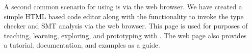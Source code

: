 A second common scenario for using \Klang{} is via the web browser. We
have created a simple HTML based \Klang{} code editor along with the
functionality to invoke the type checker and SMT analysis via the web
browser. This page is used for purposes of teaching, learning,
exploring, and prototyping with \Klang{}. The web page also provides a
tutorial, documentation, and \Klang{} examples as a guide. 

